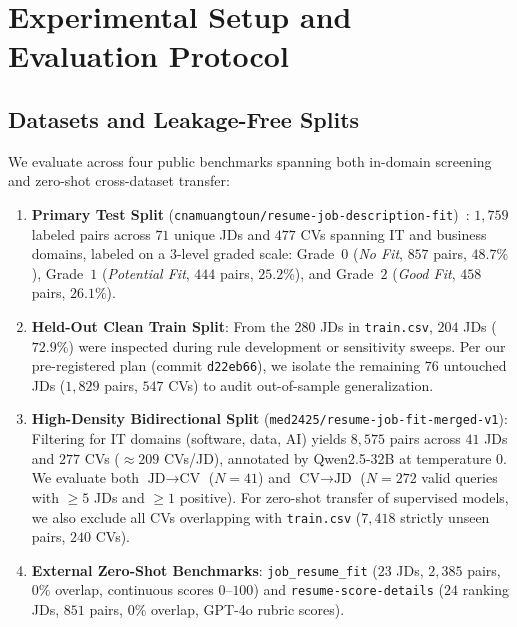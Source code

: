 \section{Experimental Setup and Evaluation Protocol}

\subsection{Datasets and Leakage-Free Splits}
We evaluate across four public benchmarks spanning both in-domain screening and zero-shot cross-dataset transfer:
\begin{enumerate}
    \item \textbf{Primary Test Split} (\texttt{cnamuangtoun/resume-job-description-fit})~\cite{huggingface_resume_fit}: $1{,}759$ labeled pairs across $71$ unique JDs and $477$ CVs spanning IT and business domains, labeled on a $3$-level graded scale: Grade~$0$ (\textit{No Fit}, $857$ pairs, $48.7\%$), Grade~$1$ (\textit{Potential Fit}, $444$ pairs, $25.2\%$), and Grade~$2$ (\textit{Good Fit}, $458$ pairs, $26.1\%$).
    \item \textbf{Held-Out Clean Train Split}: From the $280$ JDs in \texttt{train.csv}, $204$ JDs ($72.9\%$) were inspected during rule development or sensitivity sweeps. Per our pre-registered plan (commit \texttt{d22eb66}), we isolate the remaining $76$ untouched JDs ($1{,}829$ pairs, $547$ CVs) to audit out-of-sample generalization.
    \item \textbf{High-Density Bidirectional Split} (\texttt{med2425/\allowbreak resume-job-fit-\allowbreak merged-v1}): Filtering for IT domains (software, data, AI) yields $8{,}575$ pairs across $41$ JDs and $277$ CVs ($\approx 209$ CVs/JD), annotated by Qwen2.5-32B at temperature $0$. We evaluate both $\text{JD}\rightarrow\text{CV}$ ($N=41$) and $\text{CV}\rightarrow\text{JD}$ ($N=272$ valid queries with $\ge 5$ JDs and $\ge 1$ positive). For zero-shot transfer of supervised models, we also exclude all CVs overlapping with \texttt{train.csv} ($7{,}418$ strictly unseen pairs, $240$ CVs).
    \item \textbf{External Zero-Shot Benchmarks}: \texttt{job\_resume\_fit} ($23$ JDs, $2{,}385$ pairs, $0\%$ overlap, continuous scores $0$--$100$) and \texttt{resume-score-details} ($24$ ranking JDs, $851$ pairs, $0\%$ overlap, GPT-4o rubric scores).
\end{enumerate}

